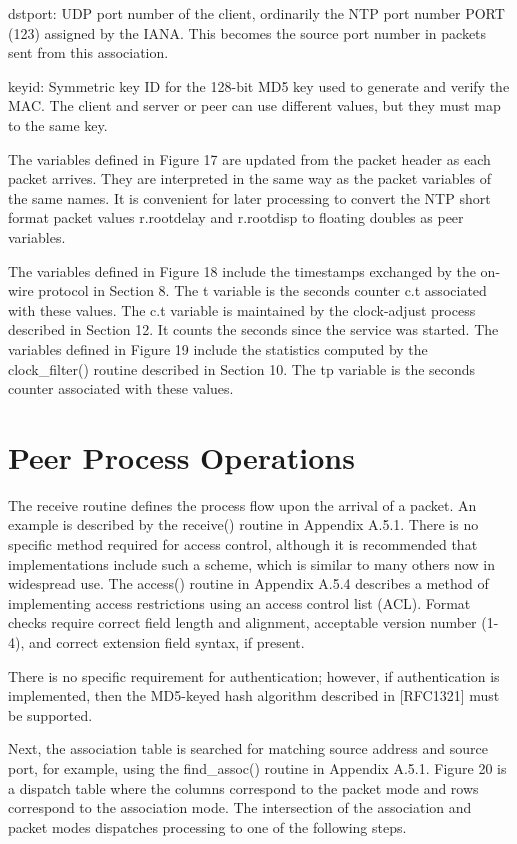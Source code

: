 dstport: UDP port number of the client, ordinarily the NTP port
number PORT (123) assigned by the IANA. This becomes the source port
number in packets sent from this association.

keyid: Symmetric key ID for the 128-bit MD5 key used to generate and
verify the MAC. The client and server or peer can use different
values, but they must map to the same key.

The variables defined in Figure 17 are updated from the packet header
as each packet arrives. They are interpreted in the same way as the
packet variables of the same names. It is convenient for later
processing to convert the NTP short format packet values r.rootdelay
and r.rootdisp to floating doubles as peer variables.

The variables defined in Figure 18 include the timestamps exchanged
by the on-wire protocol in Section 8. The t variable is the seconds
counter c.t associated with these values. The c.t variable is
maintained by the clock-adjust process described in Section 12. It
counts the seconds since the service was started. The variables
defined in Figure 19 include the statistics computed by the
clock\_filter() routine described in Section 10. The tp variable is
the seconds counter associated with these values.

\section{Peer Process Operations}

The receive routine defines the process flow upon the arrival of a
packet. An example is described by the receive() routine in
Appendix A.5.1. There is no specific method required for access
control, although it is recommended that implementations include such
a scheme, which is similar to many others now in widespread use. The
access() routine in Appendix A.5.4 describes a method of implementing
access restrictions using an access control list (ACL). Format
checks require correct field length and alignment, acceptable version
number (1-4), and correct extension field syntax, if present.

There is no specific requirement for authentication; however, if
authentication is implemented, then the MD5-keyed hash algorithm
described in [RFC1321] must be supported.

Next, the association table is searched for matching source address
and source port, for example, using the find\_assoc() routine in
Appendix A.5.1. Figure 20 is a dispatch table where the columns
correspond to the packet mode and rows correspond to the association
mode. The intersection of the association and packet modes
dispatches processing to one of the following steps.

